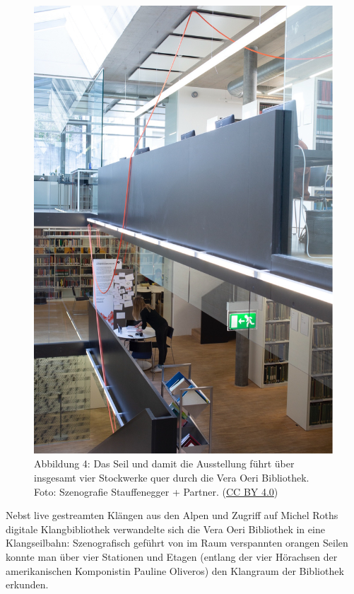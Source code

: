 \documentclass[a4paper,
fontsize=11pt,
oneside,
numbers=noperiodatend,
parskip=half-,
bibliography=totoc,
final
]{scrartcl}
\begin{document}
\begin{figure}[H]
\centering
\includegraphics{img/Abb4.jpg}
\caption{Abbildung 4: Das Seil und damit die Ausstellung führt über
insgesamt vier Stockwerke quer durch die Vera Oeri Bibliothek. Foto:
Szenografie Stauffenegger + Partner. (\href{https://creativecommons.org/licenses/by/4.0/}{CC BY 4.0})}
\end{figure}

Nebst live gestreamten Klängen aus den Alpen und Zugriff auf Michel
Roths digitale Klangbibliothek verwandelte sich die Vera Oeri Bibliothek
in eine Klangseilbahn: Szenografisch geführt von im Raum verspannten
orangen Seilen konnte man über vier Stationen und Etagen (entlang der
vier Hörachsen der amerikanischen Komponistin Pauline Oliveros) den
Klangraum der Bibliothek erkunden.
\end{document}

